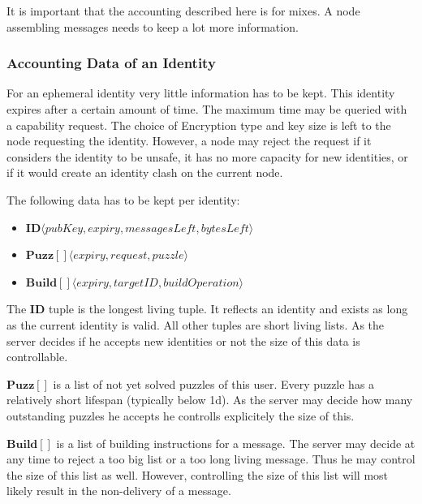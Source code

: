 It is important that the accounting described here is for mixes. A node assembling messages needs to keep a lot more information.

\subsubsection{Accounting Data of an Identity}
For an ephemeral identity very little information has to be kept. This identity expires after a certain amount of time. The maximum time may be queried with a capability request. The choice of Encryption type and key size is left to the node requesting the identity. However, a node may reject the request if it considers the identity to be unsafe, it has no more capacity for new identities, or if it would create an identity clash on the current node.

The following data has to be kept per identity:
\begin{itemize}
	\item $\mathbf{ID}\langle pubKey, expiry, messagesLeft, bytesLeft \rangle$
	\item $\mathbf{Puzz[]}\langle expiry, request, puzzle \rangle$
	\item $\mathbf{Build[]}\langle expiry, targetID, buildOperation \rangle$
\end{itemize}
The $\mathbf{ID}$ tuple is the longest living tuple. It reflects an identity and exists as long as the current identity is valid. All other tuples are short living lists. As the server decides if he accepts new identities or not the size of this data is controllable.

$\mathbf{Puzz[]}$ is a list of not yet solved puzzles of this user. Every puzzle has a relatively short lifespan (typically below 1d). As the server may decide how many outstanding puzzles he accepts he controlls explicitely the size of this.

$\mathbf{Build[]}$ is a list of building instructions for a message. The server may decide at any time to reject a too big list or a too long living message. Thus he may control the size of this list as well. However, controlling the size of this list will most likely result in the non-delivery of a message.

